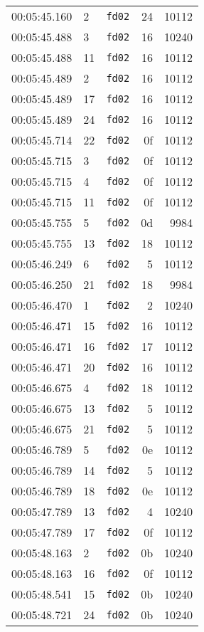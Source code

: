 \documentclass{article}
\begin{document}
\begin{longtable}{lllrr}
00:05:45.160 & 2 & \texttt{fd02} & 24 & 10112 \\
00:05:45.488 & 3 & \texttt{fd02} & 16 & 10240 \\
00:05:45.488 & 11 & \texttt{fd02} & 16 & 10112 \\
00:05:45.489 & 2 & \texttt{fd02} & 16 & 10112 \\
00:05:45.489 & 17 & \texttt{fd02} & 16 & 10112 \\
00:05:45.489 & 24 & \texttt{fd02} & 16 & 10112 \\
00:05:45.714 & 22 & \texttt{fd02} & 0f & 10112 \\
00:05:45.715 & 3 & \texttt{fd02} & 0f & 10112 \\
00:05:45.715 & 4 & \texttt{fd02} & 0f & 10112 \\
00:05:45.715 & 11 & \texttt{fd02} & 0f & 10112 \\
00:05:45.755 & 5 & \texttt{fd02} & 0d & 9984 \\
00:05:45.755 & 13 & \texttt{fd02} & 18 & 10112 \\
00:05:46.249 & 6 & \texttt{fd02} & 5 & 10112 \\
00:05:46.250 & 21 & \texttt{fd02} & 18 & 9984 \\
00:05:46.470 & 1 & \texttt{fd02} & 2 & 10240 \\
00:05:46.471 & 15 & \texttt{fd02} & 16 & 10112 \\
00:05:46.471 & 16 & \texttt{fd02} & 17 & 10112 \\
00:05:46.471 & 20 & \texttt{fd02} & 16 & 10112 \\
00:05:46.675 & 4 & \texttt{fd02} & 18 & 10112 \\
00:05:46.675 & 13 & \texttt{fd02} & 5 & 10112 \\
00:05:46.675 & 21 & \texttt{fd02} & 5 & 10112 \\
00:05:46.789 & 5 & \texttt{fd02} & 0e & 10112 \\
00:05:46.789 & 14 & \texttt{fd02} & 5 & 10112 \\
00:05:46.789 & 18 & \texttt{fd02} & 0e & 10112 \\
00:05:47.789 & 13 & \texttt{fd02} & 4 & 10240 \\
00:05:47.789 & 17 & \texttt{fd02} & 0f & 10112 \\
00:05:48.163 & 2 & \texttt{fd02} & 0b & 10240 \\
00:05:48.163 & 16 & \texttt{fd02} & 0f & 10112 \\
00:05:48.541 & 15 & \texttt{fd02} & 0b & 10240 \\
00:05:48.721 & 24 & \texttt{fd02} & 0b & 10240 \\

\end{longtable}
\end{document}
